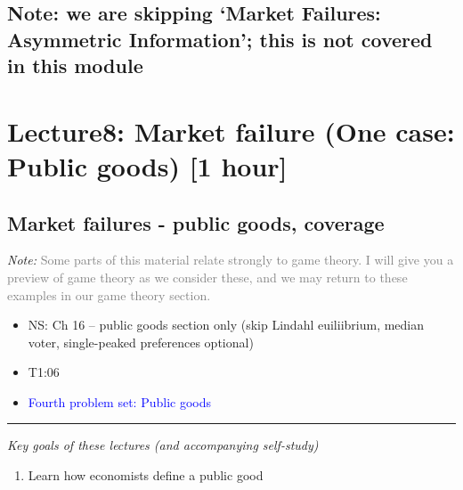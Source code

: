 \documentclass[]{article}
\providecommand{\tightlist}{%
  \setlength{\itemsep}{0pt}\setlength{\parskip}{0pt}}
\begin{document}
\hypertarget{note-we-are-skipping-market-failures-asymmetric-information-this-is-not-covered-in-this-module}{%
\subsection{Note: we are skipping `Market Failures: Asymmetric
Information'; this is not covered in this
module}\label{note-we-are-skipping-market-failures-asymmetric-information-this-is-not-covered-in-this-module}}

\hypertarget{lecture8-market-failure-one-case-public-goods-1-hour}{%
\section{Lecture8: Market failure (One case: Public goods) {[}1
hour{]}}\label{lecture8-market-failure-one-case-public-goods-1-hour}}

\hypertarget{market-failures---public-goods-coverage}{%
\subsection{Market failures - public goods,
coverage}\label{market-failures---public-goods-coverage}}

\emph{Note:}
\textcolor{gray}{Some parts of this material relate strongly to game theory. I will give you a preview of game theory as we consider these, and we may return to these examples in our game theory section.}

\begin{itemize}
\item
  NS: Ch 16 -- public goods section only (skip Lindahl euiliibrium,
  median voter, single-peaked preferences optional)
\item
  T1:06
\item
  \textcolor{blue}{Fourth problem set: Public goods }
\end{itemize}

\begin{center}\rule{0.5\linewidth}{\linethickness}\end{center}

\emph{Key goals of these lectures (and accompanying self-study)}

\begin{enumerate}
\def\labelenumi{\arabic{enumi}.}
\tightlist
\item
  Learn how economists define a public good
\end{enumerate}
\end{document}
